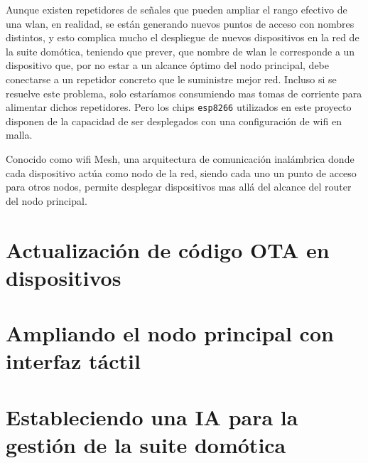 Aunque existen repetidores de señales que pueden ampliar el rango efectivo de una \gls{wlan}, en realidad, se están generando nuevos puntos de acceso con nombres distintos, y esto complica mucho el despliegue de nuevos dispositivos en la red de la suite domótica, teniendo que prever, que nombre de \gls{wlan} le corresponde a un dispositivo que, por no estar a un alcance óptimo del nodo principal, debe conectarse a un repetidor concreto que le suministre mejor red. Incluso si se resuelve este problema, solo estaríamos consumiendo mas tomas de corriente para alimentar dichos repetidores. Pero los chips \verb|esp8266| utilizados en este proyecto disponen de la capacidad de ser desplegados con una configuración de \gls{wifi} en malla.

\vspace{1cm}

Conocido como \gls{wifi} Mesh, una arquitectura de comunicación inalámbrica donde cada dispositivo actúa como nodo de la red, siendo cada uno un punto de acceso para otros nodos, permite desplegar dispositivos mas allá del alcance del router del nodo principal.

\section{Actualización de código OTA en dispositivos}
\label{ch:Capitulo6.3}

\section{Ampliando el nodo principal con interfaz táctil}
\label{ch:Capitulo6.4}

\section{Estableciendo una IA para la gestión de la suite domótica}
\label{ch:Capitulo6.5}